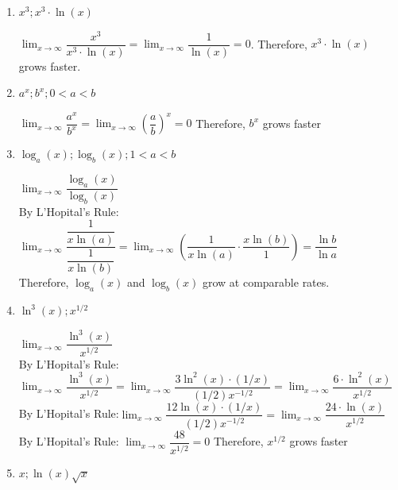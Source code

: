 \documentclass{ximera}
\begin{document}
\begin{problem}
\begin{enumerate}
\begin{explanation}
		\end{explanation}
	

\item $x^3;  x^3 \cdot \ln(x)$
		\begin{explanation}
		$\displaystyle \lim_{x \to \infty}\dfrac{x^3}{x^3 \cdot \ln(x)}=\displaystyle \lim_{x \to \infty}\dfrac{1}{\ln(x)}=0$.  
		Therefore, $x^3 \cdot \ln(x)$ grows faster.
		
		\end{explanation}
	\item $a^x; b^x; 0<a<b$
	\begin{explanation}
		$\displaystyle \lim_{x \to \infty}\dfrac{a^x}{b^x}=\displaystyle \lim_{x \to \infty}\left(\dfrac{a}{b}\right)^x=0$
		Therefore, $b^x$ grows faster
	
	
	\end{explanation}
	\item $\log_a(x); \log_b(x); 1<a<b$
	\begin{explanation}
	$\displaystyle \lim_{x \to \infty}\dfrac{\log_a(x)}{\log_b(x)}$\\
	By L'Hopital's Rule: $\displaystyle \lim_{x \to \infty}\dfrac{\dfrac{1}{x\ln(a)}}{\dfrac{1}{x\ln(b)}}=\displaystyle \lim_{x \to \infty}\left(\dfrac{1}{x\ln(a)} \cdot \dfrac{x\ln(b)}{1}\right)=\dfrac{\ln b}{\ln a}$\\
	Therefore, $\log_a(x)$ and $\log_b(x)$ grow at comparable rates.
	
		\end{explanation}
	\item $\ln^{3} (x); x^{1/2}$
		\begin{explanation}
	$\displaystyle \lim_{x \to \infty}\dfrac{\ln^{3}(x)}{x^{1/2}}$\\
	By L'Hopital's Rule:$\displaystyle \lim_{x \to \infty}\dfrac{\ln^{3}(x)}{x^{1/2}}=\displaystyle \lim_{x \to \infty}\dfrac{3\ln^2 (x) \cdot (1/x)}{(1/2)x^{-1/2}}=\displaystyle \lim_{x \to \infty}\dfrac{6 \cdot \ln^2 (x)}{x^{1/2}}$\\
	By L'Hopital's Rule:$\displaystyle \lim_{x \to \infty}\dfrac{12\ln (x) \cdot (1/x)}{(1/2)x^{-1/2}}=\displaystyle \lim_{x \to \infty}\dfrac{24 \cdot \ln (x)}{x^{1/2}}$\\
	By L'Hopital's Rule: $\displaystyle \lim_{x \to \infty}\dfrac{48}{x^{1/2}}=0$
	Therefore, $x^{1/2}$ grows faster
		\end{explanation}

	\item $x; \ln(x)\sqrt{x}$
		\begin{explanation}
	

\end{explanation}
\end{enumerate}
\end{problem}
\end{document}
